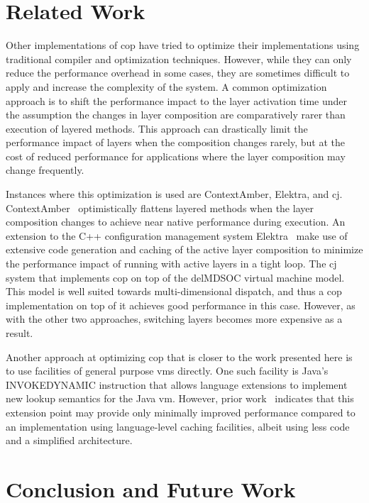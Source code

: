 \documentclass[preprint,english,10pt,nonatbib]{sigplanconf}
\begin{document}

\section{Related Work}

Other implementations of \acrlong{cop} have tried to optimize their
implementations using traditional compiler and optimization techniques. However,
while they can only reduce the performance overhead in some cases, they are
sometimes difficult to apply and increase the complexity of the system. A common
optimization approach is to shift the performance impact to the layer activation
time under the assumption the changes in layer composition are comparatively
rarer than execution of layered methods. This approach can drastically limit the
performance impact of layers when the composition changes rarely, but at the
cost of reduced performance for applications where the layer composition may
change frequently.

Instances where this optimization is used are ContextAmber, Elektra, and
cj. ContextAmber~\cite{springer2015efficient} optimistically flattens layered
methods when the layer composition changes to achieve near native performance
during execution. An extension to the C++ configuration management system
Elektra~\cite{Raab:2014:PEE:2637066.2637074} make use of extensive code
generation and caching of the active layer composition to minimize the
performance impact of running with active layers in a tight loop. The
cj\cite{schippers2009implementation,schippers2008delegation} system that
implements \ac{cop} on top of the delMDSOC virtual machine model. This model is
well suited towards multi-dimensional dispatch, and thus a \ac{cop}
implementation on top of it achieves good performance in this case. However, as
with the other two approaches, switching layers becomes more expensive as a
result.

Another approach at optimizing \ac{cop} that is closer to the work presented
here is to use facilities of general purpose \acp{vm} directly. One such
facility is Java's INVOKEDYNAMIC instruction that allows language extensions to
implement new lookup semantics for the Java \ac{vm}. However, prior
work~\cite{appeltauer2010layered} indicates that this extension point may
provide only minimally improved performance compared to an implementation using
language-level caching facilities, albeit using less code and a simplified
architecture.

\section{Conclusion and Future Work}
\end{document}
